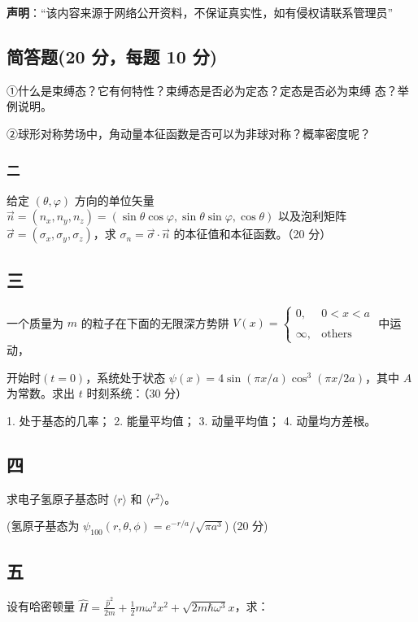 
\textbf{声明}：“该内容来源于网络公开资料，不保证真实性，如有侵权请联系管理员”

\subsection{简答题(20 分，每题 10 分)}
①什么是束缚态？它有何特性？束缚态是否必为定态？定态是否必为束缚
态？举例说明。

②球形对称势场中，角动量本征函数是否可以为非球对称？概率密度呢？

\subsubsection{二}
 给定 $\left( \theta, \varphi \right)$ 方向的单位矢量 $\vec{n} = \left( n_x, n_y, n_z \right) = \left( \sin \theta \cos \varphi, \sin \theta \sin \varphi, \cos \theta \right)$ 以及泡利矩阵 $\vec{\sigma} = \left( \sigma_x, \sigma_y, \sigma_z \right)$，求 $\sigma_n = \vec{\sigma} \cdot \vec{n}$ 的本征值和本征函数。（20 分）

\subsection{三}
一个质量为 $m$ 的粒子在下面的无限深方势阱 $V(x) = 
\begin{cases} 
0, & 0 < x < a \\\\ 
\infty, & \text{others} 
\end{cases}$ 中运动，

开始时$(t=0)$，系统处于状态 $\psi(x) = 4\sin(\pi x/a)\cos^3(\pi x/2a)$，其中 $A$ 为常数。求出 $t$ 时刻系统：（30 分）

1. 处于基态的几率；
2. 能量平均值；
3. 动量平均值；
4. 动量均方差根。

\subsection{四}
求电子氢原子基态时 $\langle r \rangle$ 和 $ \langle r^2 \rangle$。

(氢原子基态为 $\psi_{100}(r, \theta, \phi) = e^{-r/a}/{\sqrt{\pi a^3}} $) (20 分)

\subsection{五}
设有哈密顿量 $\hat H = \frac{\hat p^2}{2m} + \frac{1}{2}m\omega^2 x^2 + \sqrt{2m\hbar\omega^3} x$，求：

